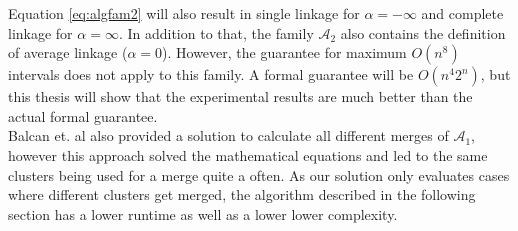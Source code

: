 Equation \ref{eq:algfam2} will also result in single linkage for $\alpha = - \infty$ and complete linkage for $\alpha = \infty$. In addition to that, the family $\mathcal{A}_2$ also contains the definition of average linkage ($\alpha = 0$). However, the guarantee for maximum $O(n^8)$ intervals does not apply to this family. A formal guarantee will be $O(n^4 2^n)$, but this thesis will show that the experimental results are much better than the actual formal guarantee.\\

Balcan et. al also provided a solution to calculate all different merges of $\mathcal{A}_1$, however this approach solved the mathematical equations and led to the same clusters being used for a merge quite a often. As our solution only evaluates cases where different clusters get merged, the algorithm described in the following section has a lower runtime as well as a lower lower complexity.
